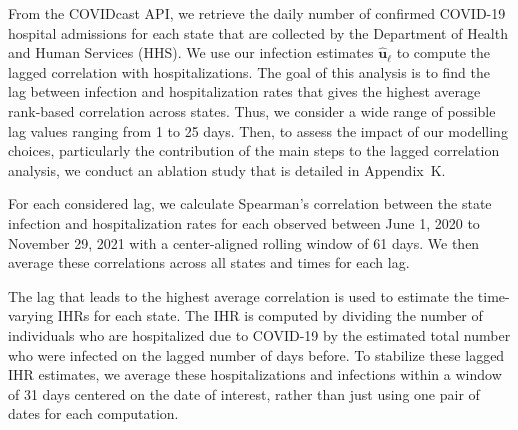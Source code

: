 From the COVIDcast API, \citep{reinhart2021open} we retrieve the daily number of
confirmed COVID-19 hospital admissions for each state that are collected by the
\US Department of Health and Human Services (HHS). We use our infection
estimates $\mathbf{\widehat{u}}_\ell$ to compute the lagged correlation with 
hospitalizations. The goal of this analysis is to find the lag between
infection and hospitalization rates that gives the highest average rank-based
correlation across \US states. Thus, we consider a wide range of possible
lag values ranging from 1 to 25 days. 
Then, to assess the impact of our modelling choices,
particularly the contribution of the main steps to the lagged
correlation analysis, we conduct an ablation study that is detailed
in Appendix~K.


For each considered lag, we calculate Spearman's correlation between the state
infection and hospitalization rates for each observed between June 1, 2020 to
November 29, 2021 with a center-aligned rolling window of 61 days. We then
average these correlations across all states and times for each lag. 

The lag that leads to the highest average correlation is used to estimate the
time-varying IHRs for each state. The IHR is computed by dividing the number of
individuals who are hospitalized due to COVID-19 by the estimated total number
who were infected on the lagged number of days before. To stabilize these lagged
IHR estimates, we average these hospitalizations and infections within a window
of 31 days centered on the date of interest, rather than just using one pair of
dates for each computation. 
